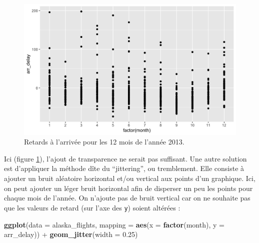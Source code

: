 \documentclass[a4paperpaper,]{article}
\newenvironment{Shaded}{\begin{snugshade}}{\end{snugshade}}
\newcommand{\DataTypeTok}[1]{\textcolor[rgb]{0.00,0.34,0.68}{#1}}
\newcommand{\FloatTok}[1]{\textcolor[rgb]{0.69,0.50,0.00}{#1}}
\newcommand{\KeywordTok}[1]{\textcolor[rgb]{0.12,0.11,0.11}{\textbf{#1}}}
\newcommand{\NormalTok}[1]{\textcolor[rgb]{0.12,0.11,0.11}{#1}}
\newcommand{\OperatorTok}[1]{\textcolor[rgb]{0.12,0.11,0.11}{#1}}
\newcommand{\StringTok}[1]{\textcolor[rgb]{0.75,0.01,0.01}{#1}}
\begin{document}
\begin{figure}[htpb]

{\centering \includegraphics[width=0.9\linewidth]{figure/transpfactor-1} 

}

\caption{Retards à l'arrivée pour les 12 mois de l'année 2013.}\label{fig:transpfactor}
\end{figure}

Ici (figure \ref{fig:transpfactor}), l'ajout de transparence ne serait pas suffisant. Une autre solution est d'appliquer la méthode dîte du ``jittering'', ou tremblement. Elle consiste à ajouter un bruit aléatoire horizontal et/ou vertical aux points d'un graphique. Ici, on peut ajouter un léger bruit horizontal afin de disperser un peu les points pour chaque mois de l'année. On n'ajoute pas de bruit vertical car on ne souhaite pas que les valeurs de retard (sur l'axe des \texttt{y}) soient altérées :

\begin{Shaded}
\begin{Highlighting}[]
\KeywordTok{ggplot}\NormalTok{(}\DataTypeTok{data =}\NormalTok{ alaska_flights, }
       \DataTypeTok{mapping =} \KeywordTok{aes}\NormalTok{(}\DataTypeTok{x =} \KeywordTok{factor}\NormalTok{(month), }\DataTypeTok{y =}\NormalTok{ arr_delay)) }\OperatorTok{+}
\StringTok{  }\KeywordTok{geom_jitter}\NormalTok{(}\DataTypeTok{width =} \FloatTok{0.25}\NormalTok{)}
\end{Highlighting}
\end{Shaded}
\end{document}
